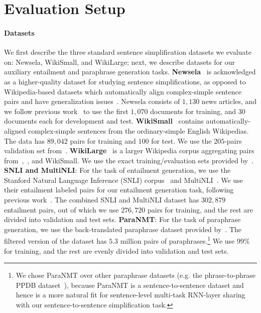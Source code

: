 \documentclass[11pt]{article}
\begin{document}
 


\section{Evaluation Setup}
\label{section:setup}

\paragraph{Datasets}
\label{subsec:datasets}
We first describe the three standard sentence simplification datasets we evaluate on: Newsela, WikiSmall, and WikiLarge; next, we describe datasets for our auxiliary entailment and paraphrase generation tasks. \textbf{Newsela}~\cite{xu2015problems} is acknowledged as a higher-quality dataset for studying sentence simplifications, as opposed to Wikipedia-based datasets which automatically align complex-simple sentence pairs and have generalization issues~\cite{zhang2017dress,xu2015problems,amancio2014analysis,hwang2015aligning,vstajner2015deeper}. Newsela consists of $1,130$ news articles, 
and we follow previous work~\cite{zhang2017dress} to use the first $1,070$ documents for training, and $30$ documents each for development and test.
\textbf{WikiSmall}~\cite{Zhu2010AMT} contains automatically-aligned complex-simple sentences from the ordinary-simple English Wikipedias. The data has $89,042$ pairs for training and $100$ for test. We use the $205$-pairs validation set from~.
\textbf{WikiLarge}~\cite{zhang2017dress} is a larger Wikipedia corpus aggregating pairs from~,~, and WikiSmall. We use the exact training/evaluation sets provided by~.
\textbf{SNLI and MultiNLI}: For the task of entailment generation, we use the Stanford Natural Language Inference (SNLI) corpus~\cite{bowman2016snli} and MultiNLI~\cite{williams2017broad}. We use their entailment labeled pairs for our entailment generation task, following previous work~\cite{pasunuru2017multitask}. The combined SNLI and MultiNLI dataset has $302,879$ entailment pairs, out of which we use $276,720$ pairs for training, and the rest are divided into validation and test sets. 
\textbf{ParaNMT}: For the task of paraphrase generation, we use the back-translated paraphrase dataset provided by~. The filtered version of the dataset has $5.3$ million pairs of paraphrases.\footnote{We chose ParaNMT over other paraphrase datasets (e.g. the phrase-to-phrase PPDB dataset~\cite{ganitkevitch2013ppdb}), because ParaNMT is a sentence-to-sentence dataset and hence is a more natural fit for sentence-level multi-task RNN-layer sharing with our sentence-to-sentence simplification task.} We use $99\%$ for training, and the rest are evenly divided into validation and test sets.
\end{document}
